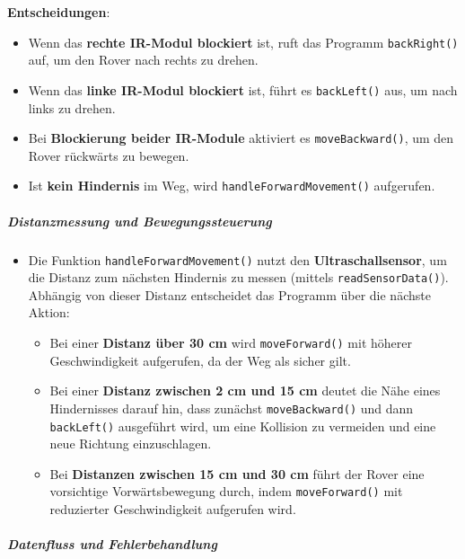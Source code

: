\documentclass{vorlage-design-main}
\begin{document}
\textbf{Entscheidungen}:

\begin{itemize}

\item
  Wenn das \textbf{rechte IR-Modul blockiert} ist, ruft das Programm
  \verb|backRight()| auf, um den Rover nach rechts zu
  drehen.
\item
  Wenn das \textbf{linke IR-Modul blockiert} ist, führt es
  \verb|backLeft()| aus, um nach links zu drehen.
\item
  Bei \textbf{Blockierung beider IR-Module} aktiviert es
  \verb|moveBackward()|, um den Rover rückwärts zu
  bewegen.
\item
  Ist \textbf{kein Hindernis} im Weg, wird
  \verb|handleForwardMovement()| aufgerufen.
\end{itemize}

\hypertarget{distanzmessung-und-bewegungssteuerung}{%
\subparagraph{Distanzmessung und
Bewegungssteuerung}\label{distanzmessung-und-bewegungssteuerung}}

\begin{itemize}

\item
  Die Funktion \verb|handleForwardMovement()| nutzt
  den \textbf{Ultraschallsensor}, um die Distanz zum nächsten Hindernis
  zu messen (mittels \verb|readSensorData()|).
  Abhängig von dieser Distanz entscheidet das Programm über die nächste
  Aktion:

  \begin{itemize}
  
  \item
    Bei einer \textbf{Distanz über 30 cm} wird
    \verb|moveForward()| mit höherer Geschwindigkeit
    aufgerufen, da der Weg als sicher gilt.
  \item
    Bei einer \textbf{Distanz zwischen 2 cm und 15 cm} deutet die Nähe
    eines Hindernisses darauf hin, dass zunächst
    \verb|moveBackward()| und dann
    \verb|backLeft()| ausgeführt wird, um eine
    Kollision zu vermeiden und eine neue Richtung einzuschlagen.
  \item
    Bei \textbf{Distanzen zwischen 15 cm und 30 cm} führt der Rover eine
    vorsichtige Vorwärtsbewegung durch, indem
    \verb|moveForward()| mit reduzierter
    Geschwindigkeit aufgerufen wird.
  \end{itemize}
\end{itemize}

\hypertarget{datenfluss-und-fehlerbehandlung}{%
\subparagraph{Datenfluss und
Fehlerbehandlung}\label{datenfluss-und-fehlerbehandlung}}
\end{document}
